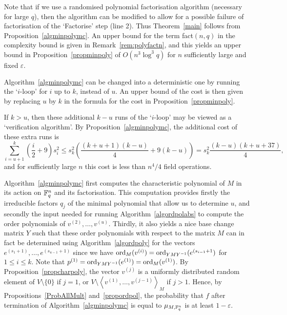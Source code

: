 \begin{Rem}
Note that if we use a randomised polynomial factorisation algorithm
(necessary for large $q$), then the algorithm can be modified to allow
for a possible failure of factorisation of the `Factorise' step (line
2). Thus Theorem~\ref{main} follows from Proposition~\ref{algminpolymc}.
An upper bound for the term {\rm fact}$(n,q)$ in the complexity
bound is given in Remark~{\rm\ref{rem:polyfactn}}, and this yields an
upper bound in Proposition~{\rm\ref{propminpoly}} of $O(n^3\log^3 q)$
for $n$ sufficiently large and fixed $\varepsilon$.
\end{Rem}

\begin{Rem}
    \label{algdeterm}
    Algorithm~\ref{algminpolymc} can be changed into a deterministic
    one by running the `$i$-loop' for $i$ up to $k$, instead of $u$. An upper
    bound of the cost is then given by replacing $u$ by $k$ in the
    formula for the cost in Proposition~\ref{propminpoly}.

If $k>u$, then these additional $k-u$ runs of the `$i$-loop' may be viewed as 
a `verification  algorithm'. By Proposition~\ref{algminpolymc}, 
%
the additional cost of these extra runs is
\[
\sum_{i=u+1}^k(\frac{i}{2}+9)s_i^2 \leq s_k^2\left(\frac{(k+u+1)(k-u)}{4}+9(k-u)\right)
= s_k^2\frac{(k-u)(k+u+37)}{4},
\]
and for sufficiently large $n$ this cost is less than 
$n^4/4$ field operations.
\end{Rem}

Algorithm~\ref{algminpolymc} first computes the characteristic
polynomial of $M$ in its action on $\mathbb{F}_q^n$ and its factorisation.
This computation provides firstly the irreducible factors $q_j$ of
the minimal polynomial that allow us to determine $u$, and secondly
the input needed for running Algorithm~\ref{algordpolabs} to compute
the order polynomials of $v^{(2)}, \ldots, 
v^{(u)}$. Thirdly, it also yields a nice base change matrix $Y$ such 
that these order polynomials with respect to the matrix $M$ can in
fact be determined using Algorithm~\ref{algordpoly} for the vectors
$e^{(s_1+1)},\ldots,e^{(s_{u-1}+1)}$ since we have
$\mathrm{ord}_M(v^{(i)}) = \mathrm{ord}_{YMY^{-1}}(e^{(s_{i-1}+1})$ for $1 \le i \le
k$. Note that
$p^{(1)} = \mathrm{ord}_{YMY^{-1}}(e^{(1)}) = \mathrm{ord}_M(v^{(1)})$. 
By Proposition~\ref{propcharpoly},
the vector $v^{(j)}$ is a uniformly distributed random element of
$V\setminus\{0\}$ if $j=1$, or $V\setminus\left< v^{(1)}, \ldots,
v^{(j-1)}\right>_M$ if $j>1$. Hence, by Propositions~\ref{ProbAllMult}
and~\ref{propordpol}, the probability that $f$ after termination of
Algorithm~\ref{algminpolymc} is equal to $\mu_{M,\mathbb{F}_q^n}$ is at least
$1-\varepsilon$.

